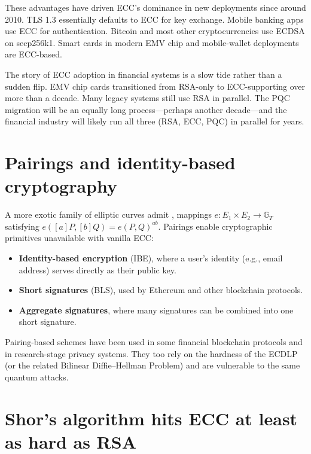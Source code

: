 These advantages have driven ECC's dominance in new deployments since around 2010. TLS 1.3 essentially defaults to ECC for key exchange. Mobile banking apps use ECC for authentication. Bitcoin and most other cryptocurrencies use ECDSA on secp256k1. Smart cards in modern EMV chip and mobile-wallet deployments are ECC-based.

\begin{remark}
The story of ECC adoption in financial systems is a slow tide rather than a sudden flip. EMV chip cards transitioned from RSA-only to ECC-supporting over more than a decade. Many legacy systems still use RSA in parallel. The PQC migration will be an equally long process---perhaps another decade---and the financial industry will likely run all three (RSA, ECC, PQC) in parallel for years.
\end{remark}

\section{Pairings and identity-based cryptography}

A more exotic family of elliptic curves admit , mappings $e: E_1 \times E_2 \to \mathbb{G}_T$ satisfying $e([a]P, [b]Q) = e(P,Q)^{ab}$. Pairings enable cryptographic primitives unavailable with vanilla ECC:

\begin{itemize}
  \item \textbf{Identity-based encryption} (IBE), where a user's identity (e.g., email address) serves directly as their public key.
  \item \textbf{Short signatures} (BLS), used by Ethereum and other blockchain protocols.
  \item \textbf{Aggregate signatures}, where many signatures can be combined into one short signature.
\end{itemize}

Pairing-based schemes have been used in some financial blockchain protocols and in research-stage privacy systems. They too rely on the hardness of the ECDLP (or the related Bilinear Diffie--Hellman Problem) and are vulnerable to the same quantum attacks.

\section{Shor's algorithm hits ECC at least as hard as RSA}

